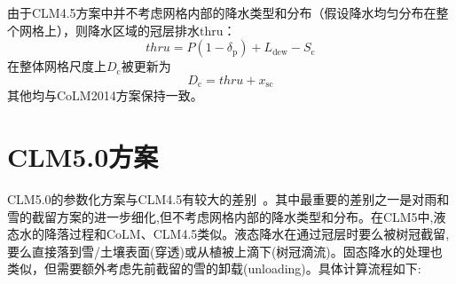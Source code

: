 由于CLM4.5方案中并不考虑网格内部的降水类型和分布（假设降水均匀分布在整个网格上），则降水区域的冠层排水${\mathrm {thru}}$：
\begin{equation}
  thru=P\left(1-\delta_{\mathrm{p}}\right)+L_{\mathrm{dew}}-S_{\mathrm{c}}
\end{equation}
在整体网格尺度上$D_{\mathrm {c}} $被更新为
\begin{equation}
  D_{\mathrm {c}} =thru+x_{\mathrm{s c}}
\end{equation}
其他均与CoLM2014方案保持一致。

\section{CLM5.0方案}
CLM5.0的参数化方案与CLM4.5有较大的差别~\citep{lawrence2019community}。其中最重要的差别之一是对雨和雪的截留方案的进一步细化,但不考虑网格内部的降水类型和分布。在CLM5中,液态水的降落过程和CoLM、CLM4.5类似。液态降水在通过冠层时要么被树冠截留,要么直接落到雪/土壤表面(穿透)或从植被上滴下(树冠滴流)。固态降水的处理也类似，但需要额外考虑先前截留的雪的卸载(unloading)。具体计算流程如下:

